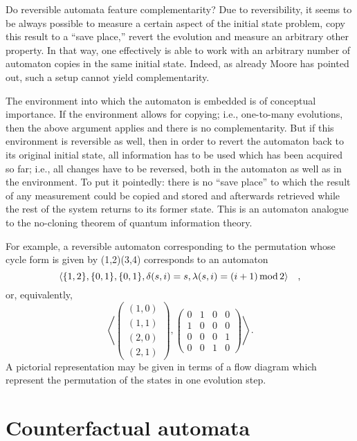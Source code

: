 \documentclass{llncs}
\begin{document}
Do reversible automata feature complementarity?
Due to reversibility, it seems to be always possible to measure
a certain aspect of the initial state problem,
copy this result to a ``save place,''
revert the evolution and measure an arbitrary other property.
In that way, one effectively is able to work with an arbitrary number of automaton copies
in the same initial state.
Indeed, as already Moore has pointed out, such a setup cannot yield complementarity.

The environment into which the  automaton is embedded is of conceptual importance.
If the environment allows for copying;
i.e., one-to-many evolutions, then the above argument applies and there is no complementarity.
But if this environment is reversible as well,
then in order to revert the automaton back to its original initial state,
all information has to be used which has been acquired so far; i.e., all changes
have to be reversed, both in the automaton as well as in the environment.
To put it pointedly: there is no  ``save place'' to which the result
of any measurement could be copied and stored and afterwards retrieved
while the rest of the system returns to its former state.
This is an automaton analogue to the no-cloning theorem of quantum information theory.

For example, a reversible automaton corresponding to the permutation whose cycle form
is given by (1,2)(3,4) corresponds to an automaton
$$\langle \{1,2\},\{0,1\},\{0,1\},\delta (s,i)=s ,\lambda (s,i)= (i+1)\,{\rm mod} \,2 \rangle \quad ,$$
or, equivalently,
\begin{equation}
\left\langle
\left(
\begin{array}{llllll}
(1,0)\\(1,1)\\(2,0)\\(2,1)
\end{array}
\right) ,
\left(
{
\begin{array}{llllll}
0&1&0&0\\
1&0&0&0\\
0&0&0&1\\
0&0&1&0
\end{array}
}
\right)
  \right\rangle .
\end{equation}
A pictorial representation may be given in terms of a flow diagram
which represent the permutation of the states in one evolution step.



\section{Counterfactual automata}
\end{document}
